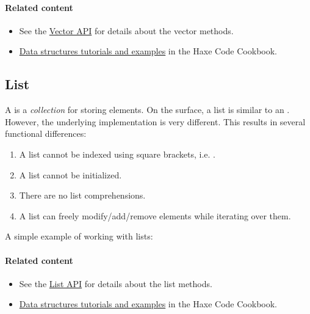 \paragraph{Related content}
\begin{itemize}
	\item See the \href{https://api.haxe.org/haxe/ds/Vector.html}{Vector API} for details about the vector methods. 
	\item \href{http://code.haxe.org/category/data-structures/}{Data structures tutorials and examples} in the Haxe Code Cookbook.
\end{itemize}


\subsection{List}
\label{std-List}
A  is a \emph{collection} for storing elements.  On the surface, a list is similar to an .  However, the underlying implementation is very different.  This results in several functional differences:

\begin{enumerate}
	\item A list cannot be indexed using square brackets, i.e. \expr{[0]}.
	\item A list cannot be initialized.
	\item There are no list comprehensions.
	\item A list can freely modify/add/remove elements while iterating over them.
\end{enumerate}

A simple example of working with lists:

\paragraph{Related content}
\begin{itemize}
	\item See the \href{https://api.haxe.org/List.html}{List API} for details about the list methods. 
	\item \href{http://code.haxe.org/category/data-structures/}{Data structures tutorials and examples} in the Haxe Code Cookbook.
\end{itemize}


